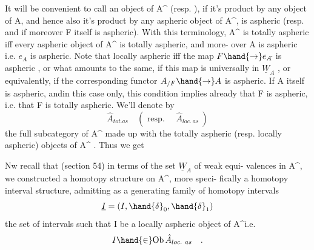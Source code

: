 It will be convenient to call an object  of A\^{} \hand{\uline{\textcolor{black}{locally}}} \hand{\uline{\textcolor{black}{aspheric}}}
(resp. \hand{\uline{\textcolor{black}{totally}}} \hand{\uline{\textcolor{black}{aspheric}}} ), if it's product  by any object of A, and hence
also it's product by any aspheric object of A\^{}, is aspheric (resp. and
if moreover F itself is aspheric). With this terminology, A\^{} is totally
aspheric iff every aspheric object of A\^{} is totally aspheric, and  more-%
over A is aspheric i.e. $e_{A\hat{}}$ is aspheric.  Note
that   locally aspheric  iff the map $F \hand{\to} e_{A\hat{}}$ is aspheric ,
or what amounts to the same, if this map is universally in $\underline{W}_A$ , or
equivalently, if the corresponding functor $A_{/F} \hand{\to} A$ is aspheric.
If A itself is aspheric, and\hand{/}in this case only, this condition implies
already that F is aspheric, i.e. that F is totally aspheric. We'll
denote by 
\[ \hat{A}_{tot.as} \quad ( \text{ resp. } \quad \hat{A}_{loc.\ as} \ ) \]
the full subcategory of A\^{} made up with the totally aspheric (resp.
locally aspheric) objects of A\^{} . Thus we get

Nw recall that (section 54) in terms of the set $\underline{W}_A$ of weak equi-%
valences in A\^{}, we constructed a homotopy structure on A\^{}, more speci-%
fically a homotopy interval structure, admitting as a generating family
of homotopy intervals 
\[ \underline{I} =(I,\hand{\delta}_0,\hand{\delta}_1) \]
the set of intervals such that I be a locally aspheric object of A\^{}\hand{\unsure{,}}i.e.
\[ I \hand{\in} \mathrm{Ob}\, \hat{A}_{loc.\ as} \quad . \]

